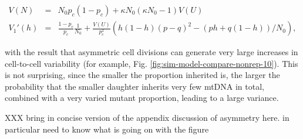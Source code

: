 \documentclass{article}
\begin{document}
\begin{eqnarray}
    V(N) & = &N_0 p_c(1-p_c) +\kappa N_0(\kappa N_0-1)V(U) \\
    V_1'(h)& = &\frac{1-p_c}{p_c} \frac{1}{N_0} + \frac{V(U)}{p_c^2} \left( h(1-h) (p-q)^2 - (p h + q(1-h))/N_0 \right),
\end{eqnarray}

with the result that asymmetric cell divisions can generate very large increases in cell-to-cell variability (for example, Fig. \ref{fig:sim-model-compare-nonrep-10}). This is not surprising, since the smaller the proportion inherited is, the larger the probability that the smaller daughter inherits very few mtDNA in total, combined with a very varied mutant proportion, leading to a large variance.

XXX bring in concise version of the appendix discussion of asymmetry here. in particular need to know what is going on with the figure
\end{document}
